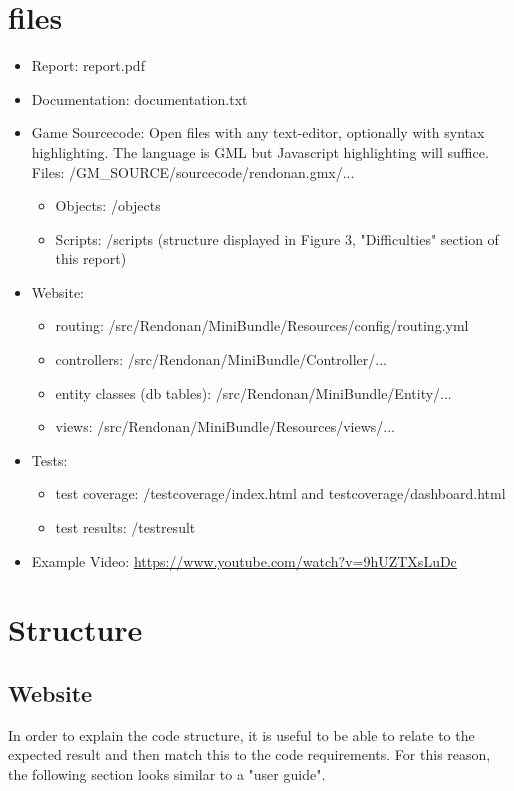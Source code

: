 \documentclass[12pt]{report}
\begin{document}
\section*{files}
\begin{itemize}
\item Report: report.pdf
\item Documentation: documentation.txt
\item Game Sourcecode: Open files with any text-editor, optionally with syntax highlighting. The language is GML but Javascript highlighting will suffice.
Files: /GM\_SOURCE/sourcecode/rendonan.gmx/...
\begin{itemize}
\item Objects: /objects
\item Scripts: /scripts (structure displayed in Figure 3, "Difficulties" section of this report)
\end{itemize}
\item Website:
\begin{itemize}
\item routing: /src/Rendonan/MiniBundle/Resources/config/routing.yml
\item controllers: /src/Rendonan/MiniBundle/Controller/...
\item entity classes (db tables): /src/Rendonan/MiniBundle/Entity/...
\item views: /src/Rendonan/MiniBundle/Resources/views/...
\end{itemize}
\item Tests:
\begin{itemize}
\item test coverage: /testcoverage/index.html and testcoverage/dashboard.html
\item test results: /testresult
\end{itemize}
\item Example Video: \url{https://www.youtube.com/watch?v=9hUZTXsLuDc}
\end{itemize}
\pagebreak

\section*{Structure}
\subsection*{Website}
In order to explain the code structure, it is useful to be able to relate to the expected result and then match this to the code requirements. For this reason, the following section looks similar to a "user guide".
\end{document}
